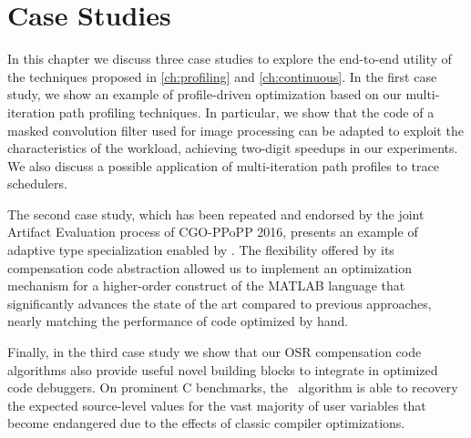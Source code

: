 \chapter{Case Studies}
\label{ch:case-studies}

In this chapter we discuss three case studies to explore the end-to-end utility of the techniques proposed in \mychapter\ref{ch:profiling} and \mychapter\ref{ch:continuous}. In the first case study, we show an example of profile-driven optimization based on our multi-iteration path profiling techniques. In particular, we show that the code of a masked convolution filter used for image processing can be adapted to exploit the characteristics of the workload, achieving two-digit speedups in our experiments. We also discuss a possible application of multi-iteration path profiles to trace schedulers.

The second case study, which has been repeated and endorsed by the joint Artifact Evaluation process of CGO-PPoPP 2016, presents an example of adaptive type specialization enabled by \osrkit. The flexibility offered by its compensation code abstraction allowed us to implement an optimization mechanism for a higher-order construct of the MATLAB language that significantly advances the state of the art compared to previous approaches, nearly matching the performance of code optimized by hand.


Finally, in the third case study we show that our OSR compensation code algorithms also provide useful novel building blocks to integrate in optimized code debuggers. On prominent C benchmarks, the \reconstruct\ algorithm is able to recovery the expected source-level values for the vast majority of user variables that become endangered due to the effects of classic compiler optimizations.




